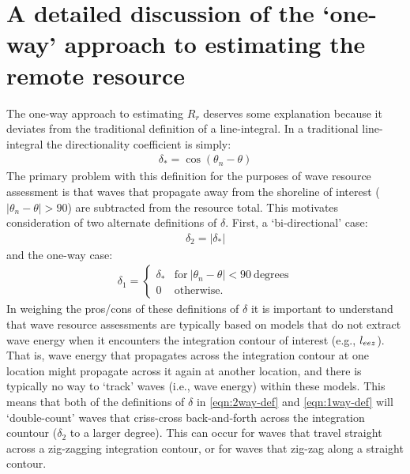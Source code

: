 \section{A detailed discussion of the `one-way' approach to estimating the remote resource} \label{appendix:one-way-method}

The one-way approach to estimating $R_r$ deserves some explanation because it deviates from the traditional definition of a line-integral. In a traditional line-integral the directionality coefficient is simply:
\begin{align}
    \delta_{*} = \cos(\theta_n - \theta)
    \label{eqn:trad-def}
\end{align}
The primary problem with this definition for the purposes of wave resource assessment is that waves that propagate away from the shoreline of interest ($|\theta_n - \theta|>90$) are subtracted from the resource total. This motivates consideration of two alternate definitions of $\delta$. First, a `bi-directional' case:
\begin{align}
    \delta_2 = |\delta_{*}|
    \label{eqn:2way-def}
\end{align}
and the one-way case:
\begin{align}
    \delta_1 = 
    \begin{cases}
     \delta_* & \mathrm{for\ }|\theta_n - \theta|<90\ \mathrm{degrees} \\
    0 & \mathrm{otherwise}.       
    \end{cases}
    \label{eqn:1way-def}
\end{align}
In weighing the pros/cons of these definitions of $\delta$ it is important to understand that wave resource assessments are typically based on models that do not extract wave energy when it encounters the integration contour of interest (e.g., $l_{eez}$). That is, wave energy that propagates across the integration contour at one location might propagate across it again at another location, and there is typically no way to `track' waves (i.e., wave energy) within these models.
This means that both of the definitions of $\delta$ in \eqref{eqn:2way-def} and \eqref{eqn:1way-def} will `double-count' waves that criss-cross back-and-forth across the integration countour ($\delta_2$ to a larger degree). This can occur for waves that travel straight across a zig-zagging integration contour, or for waves that zig-zag along a straight contour. 

